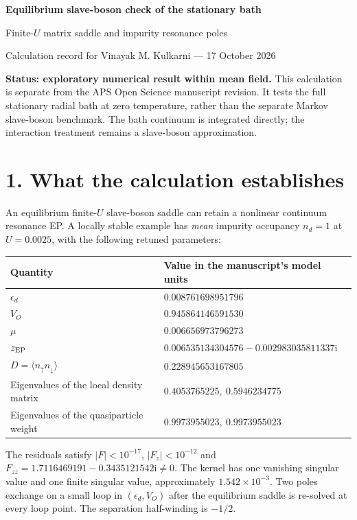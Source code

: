 \documentclass[11pt]{article}
\newcommand{\ii}{\mathrm{i}}
\begin{document}
\begin{center}
{\Large\bfseries Equilibrium slave-boson check of the stationary bath}\par\vspace{4pt}
{\large Finite-$U$ matrix saddle and impurity resonance poles}\par\vspace{5pt}
Calculation record for Vinayak M. Kulkarni --- 17 October 2026
\end{center}

\textbf{Status: exploratory numerical result within mean field.}
This calculation is separate from the APS Open Science manuscript revision.
It tests the full stationary radial bath at zero temperature, rather than the
separate Markov slave-boson benchmark. The bath continuum is integrated
directly; the interaction treatment remains a slave-boson approximation.

\section*{1. What the calculation establishes}
An equilibrium finite-$U$ slave-boson saddle can retain a nonlinear continuum
resonance EP. A locally stable example has \emph{mean} impurity occupancy
$n_d=1$ at $U=0.0025$, with the following retuned parameters:
\begin{center}
\begin{tabular}{ll}
\toprule
Quantity & Value in the manuscript's model units\\
\midrule
$\epsilon_d$ & $0.008761698951796$\\
$V_O$ & $0.945864146591530$\\
$\mu$ & $0.006656973796273$\\
$z_{\rm EP}$ & $0.006535134304576-0.002983035811337\ii$\\
$D=\langle n_\uparrow n_\downarrow\rangle$ & $0.228945653167805$\\
Eigenvalues of the local density matrix & $0.4053765225,\ 0.5946234775$\\
Eigenvalues of the quasiparticle weight & $0.9973955023,\ 0.9973955023$\\
\bottomrule
\end{tabular}
\end{center}
The residuals satisfy $|F|<10^{-17}$, $|F_z|<10^{-12}$ and
$F_{zz}=1.7116469191-0.3435121542\ii\ne0$. The kernel has one vanishing
singular value and one finite singular value, approximately $1.542\times10^{-3}$.
Two poles exchange on a small loop in $(\epsilon_d,V_O)$ after the equilibrium
saddle is re-solved at every loop point. The separation half-winding is $-1/2$.
\end{document}
